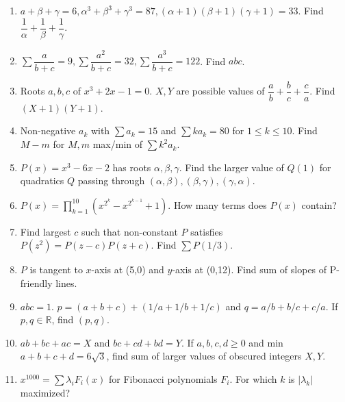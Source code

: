 \documentclass[12pt]{scrartcl}
\begin{document}
\begin{enumerate}
    \item $a+\beta+\gamma=6, \alpha^3+\beta^3+\gamma^3=87, (\alpha+1)(\beta+1)(\gamma+1)=33$. Find $\dfrac{1}{\alpha}+\dfrac{1}{\beta}+\dfrac{1}{\gamma}$.

    \item $\sum \dfrac{a}{b+c} = 9, \sum \dfrac{a^2}{b+c} = 32, \sum \dfrac{a^3}{b+c} = 122$. Find $abc$.

    \item Roots $a,b,c$ of $x^3+2x-1=0$. $X,Y$ are possible values of $\dfrac{a}{b}+\dfrac{b}{c}+\dfrac{c}{a}$. Find $(X+1)(Y+1)$.

    \item Non-negative $a_k$ with $\sum a_k=15$ and $\sum ka_k=80$ for $1 \le k \le 10$. Find $M-m$ for $M,m$ max/min of $\sum k^2 a_k$.


    \item $P(x)=x^3-6x-2$ has roots $\alpha, \beta, \gamma$. Find the larger value of $Q(1)$ for quadratics $Q$ passing through $(\alpha,\beta), (\beta,\gamma), (\gamma,\alpha)$.

    \item $P(x) = \prod_{k=1}^{10} (x^{2^k}-x^{2^{k-1}}+1)$. How many terms does $P(x)$ contain?

    \item Find largest $c$ such that non-constant $P$ satisfies $P(z^2)=P(z-c)P(z+c)$. Find $\sum P(1/3)$.

    \item $P$ is tangent to $x$-axis at (5,0) and $y$-axis at (0,12). Find sum of slopes of P-friendly lines.

    \item $abc=1$. $p=(a+b+c)+(1/a+1/b+1/c)$ and $q=a/b+b/c+c/a$. If $p,q \in \mathbb{R}$, find $(p,q)$.

    \item $ab+bc+ac=X$ and $bc+cd+bd=Y$. If $a,b,c,d \ge 0$ and min $a+b+c+d=6\sqrt{3}$, find sum of larger values of obscured integers $X,Y$.

    \item $x^{1000} = \sum \lambda_i F_i(x)$ for Fibonacci polynomials $F_i$. For which $k$ is $|\lambda_k|$ maximized?

\end{enumerate}
\end{document}

